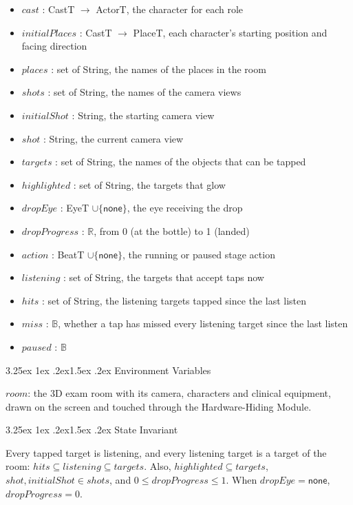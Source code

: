\documentclass[10pt, titlepage]{article}
\makeatletter
\renewcommand\paragraph{\@startsection{paragraph}{4}{\z@}%
  {3.25ex \@plus 1ex \@minus .2ex}{1.5ex \@plus .2ex}%
  {\normalfont\normalsize\bfseries}}
\newcommand{\B}{\mathbb{B}}
\newcommand{\R}{\mathbb{R}}
\newcommand{\T}[1]{\mathit{#1}}          %
\newcommand{\V}[1]{\mathsf{#1}}          %
\makeatother
\begin{document}
\begin{itemize}
\item $\T{cast}$ : CastT $\to$ ActorT, the character for each role
\item $\T{initialPlaces}$ : CastT $\to$ PlaceT, each character's starting
  position and facing direction
\item $\T{places}$ : set of String, the names of the places in the room
\item $\T{shots}$ : set of String, the names of the camera views
\item $\T{initialShot}$ : String, the starting camera view
\item $\T{shot}$ : String, the current camera view
\item $\T{targets}$ : set of String, the names of the objects that can be
  tapped
\item $\T{highlighted}$ : set of String, the targets that glow
\item $\T{dropEye}$ : EyeT $\cup \{\V{none}\}$, the eye receiving the drop
\item $\T{dropProgress}$ : $\R$, from 0 (at the bottle) to 1 (landed)
\item $\T{action}$ : BeatT $\cup \{\V{none}\}$, the running or paused
  stage action
\item $\T{listening}$ : set of String, the targets that accept taps now
\item $\T{hits}$ : set of String, the listening targets tapped since the last
  listen
\item $\T{miss}$ : $\B$, whether a tap has missed every listening target since
  the last listen
\item $\T{paused}$ : $\B$
\end{itemize}

\paragraph{Environment Variables}

$\T{room}$: the 3D exam room with its camera, characters and clinical
equipment, drawn on the screen and touched through the Hardware-Hiding Module.

\paragraph{State Invariant}

Every tapped target is listening, and every listening target is a target of
the room: $\T{hits} \subseteq \T{listening} \subseteq \T{targets}$.
Also, $\T{highlighted} \subseteq \T{targets}$,
$\T{shot}, \T{initialShot} \in \T{shots}$, and $0 \leq \T{dropProgress} \leq 1$.
When $\T{dropEye} = \V{none}$, $\T{dropProgress} = 0$.
\end{document}
